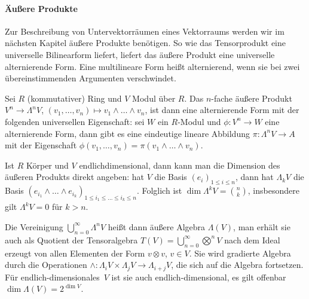 \paragraph{Äußere Produkte} Zur Beschreibung von Untervektorräumen eines Vektorraums werden wir im nächsten Kapitel äußere Produkte benötigen. So wie das Tensorprodukt eine universelle Bilinearform liefert, liefert das äußere Produkt eine universelle alternierende Form. Eine multilineare Form heißt alternierend, wenn sie bei zwei übereinstimmenden Argumenten verschwindet.

\begin{defin}
Sei $R$ (kommutativer) Ring und $V$ Modul über $R$. Das $n$-fache äußere Produkt $V^n \to \Lambda^n V$, $(v_1, \dots, v_n) \mapsto v_1 \wedge \dots \wedge v_n$, ist dann eine alternierende Form mit der folgenden universellen Eigenschaft: sei $W$ ein $R$-Modul und $\phi: V^n \to W$ eine alternierende Form, dann gibt es eine eindeutige lineare Abbildung $\pi: \Lambda^n V \to A$ mit der Eigenschaft $\phi(v_1, \dots, v_n) = \pi(v_1 \wedge \dots \wedge v_n)$.
\end{defin}

Ist $R$ Körper und $V$ endlichdimensional, dann kann man die Dimension des äußeren Produkts direkt angeben: hat $V$ die Basis $(e_i)_{1 \leq i \leq n}$, dann hat $\Lambda_k V$ die Basis $(e_{i_1} \wedge \dots \wedge e_{i_k})_{1 \leq i_1 \leq \dots \leq i_k \leq n}$. Folglich ist $\dim \Lambda^k V = \binom nk$, insbesondere gilt $\Lambda^k V = 0$ für $k > n$.

Die Vereinigung $\bigcup_{n=0}^\infty \Lambda^n V$ heißt dann äußere Algebra $\Lambda(V)$, man erhält sie auch als Quotient der Tensoralgebra $T(V) = \bigcup_{n=0}^\infty \bigotimes^n V$ nach dem Ideal erzeugt von allen Elementen der Form $v \otimes v$, $v \in V$. Sie wird gradierte Algebra durch die Operationen $\wedge: \Lambda_i V \times \Lambda_j V \to \Lambda_{i+j} V$, die sich auf die Algebra fortsetzen. Für endlich-dimensionales~$V$ ist sie auch endlich-dimensional, es gilt offenbar $\dim \Lambda(V) = 2^{\dim V}$.
